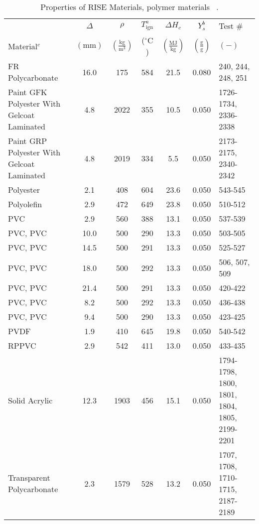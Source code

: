 \clearpage

\begin{table}[!h]
\caption[Properties of RISE Materials, polymer materials]{Properties of RISE Materials, polymer materials ~\cite{RISE:Fire_Database}.}
\centering
\begin{tabular}{|p{5cm}|c|c|c|c|c|p{3.5cm}|}
\hline
            & \centering$\Delta$& \centering$\rho$& \centering$T_{\mathrm{ign}}^{a}$&\centering$\Delta H_{c}$&\centering$Y_{s}^{b}$ & Test \# \\
Material$^{c}$    & \centering$\mathrm{\left(mm\right)}$ & \centering$\mathrm{\left(\frac{kg}{m^{3}}\right)}$ &  \centering($\mathrm{^{\circ}C}$)   & \centering$\left(\mathrm{\frac{MJ}{kg}}\right)$ & \centering$\mathrm{\left(\frac{g}{g}\right)}$ & $\mathrm{( - )}$  \\ \hline
\hline
FR Polycarbonate                                  & 16.0 & 175 & 584 & 21.5 & 0.080 & 240, 244, 248, 251 \\\hline
Paint GFK Polyester With Gelcoat Laminated        & 4.8 & 2022 & 355 & 10.5 & 0.050 & 1726-1734, 2336-2338 \\\hline
Paint GRP Polyester With Gelcoat Laminated        & 4.8 & 2019 & 334 & 5.5 & 0.050 & 2173-2175, 2340-2342 \\\hline
Polyester                                         & 2.1 & 408 & 604 & 23.6 & 0.050 & 543-545 \\\hline
Polyolefin                                        & 2.9 & 472 & 649 & 23.8 & 0.050 & 510-512 \\\hline
PVC                                               & 2.9 & 560 & 388 & 13.1 & 0.050 & 537-539 \\\hline
PVC, PVC                                          & 10.0 & 500 & 290 & 13.3 & 0.050 & 503-505 \\\hline
PVC, PVC                                          & 14.5 & 500 & 291 & 13.3 & 0.050 & 525-527 \\\hline
PVC, PVC                                          & 18.0 & 500 & 292 & 13.3 & 0.050 & 506, 507, 509 \\\hline
PVC, PVC                                          & 21.4 & 500 & 291 & 13.3 & 0.050 & 420-422 \\\hline
PVC, PVC                                          & 8.2 & 500 & 292 & 13.3 & 0.050 & 436-438 \\\hline
PVC, PVC                                          & 9.4 & 500 & 290 & 13.3 & 0.050 & 423-425 \\\hline
PVDF                                              & 1.9 & 410 & 645 & 19.8 & 0.050 & 540-542 \\\hline
RPPVC                                             & 2.9 & 542 & 411 & 13.0 & 0.050 & 433-435 \\\hline
Solid Acrylic                                     & 12.3 & 1903 & 456 & 15.1 & 0.050 & 1794-1798, 1800, 1801, 1804, 1805, 2199-2201 \\\hline
Transparent Polycarbonate                         & 2.3 & 1579 & 528 & 13.2 & 0.050 & 1707, 1708, 1710-1715, 2187-2189 \\\hline
\end{tabular}
\label{Properties_RISE_Materials_Polymers}
\end{table}
